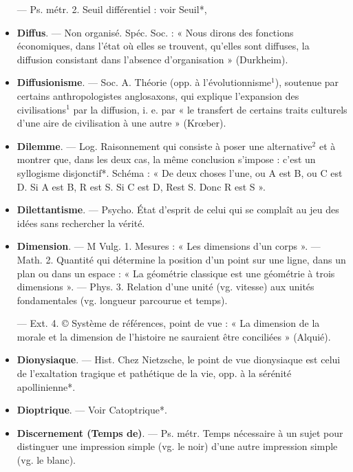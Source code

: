 \begin{itemize}[leftmargin=1cm, label=, itemsep=1pt]
— Ps. métr. 2. Seuil différentiel :
voir Seuil*,

\item {\bf Diffus}. — Non organisé. Spéc. Soc. :
« Nous dirons des fonctions économiques, dans l’état où elles se trouvent, qu’elles sont diffuses, la diffusion consistant dans l'absence d’organisation » (Durkheim).

\item {\bf Diffusionisme}. — Soc. A. Théorie
(opp. à l’évolutionnisme$^1$), soutenue
par certains anthropologistes anglosaxons, qui explique l'expansion
des civilisations$^1$ par la diffusion,
i. e. par « le transfert de certains
traits culturels d'une aire de civilisation à une autre » (Krœber).

\item {\bf Dilemme}. — Log. Raisonnement qui
consiste à poser une alternative$^2$ et
à montrer que, dans les deux cas,
la même conclusion s'impose : c’est
un syllogisme disjonctif*. Schéma :
« De deux choses l’une, ou A est B,
ou C est D. Si A est B, R est S. Si
C est D, Rest S. Donc R est S ».

\item {\bf Dilettantisme}. — Psycho. État d'esprit de celui qui se complaît au jeu
des idées sans rechercher la vérité.

\item {\bf Dimension}. — M Vulg. 1. Mesures :
« Les dimensions d’un corps ». —
Math. 2. Quantité qui détermine
la position d’un point sur une ligne,
dans un plan ou dans un espace :
« La géométrie classique est une
géométrie à trois dimensions ». —
Phys. 3. Relation d’une unité (vg.
vitesse) aux unités fondamentales
(vg. longueur parcourue et temps).

— Ext. 4. © Système de références, point de vue : « La dimension de la morale et la dimension
de l’histoire ne sauraient être conciliées » (Alquié).

\item {\bf Dionysiaque}. — Hist. Chez Nietzsche,
le point de vue dionysiaque est celui
de l’exaltation tragique et pathétique de la vie, opp. à la sérénité
apollinienne*.

\item {\bf Dioptrique}. — Voir Catoptrique*.

\item {\bf Discernement (Temps de)}. — Ps.
métr. Temps nécessaire à un sujet
pour distinguer une impression
simple (vg. le noir) d’une autre impression simple (vg. le blanc).


\end{itemize}
